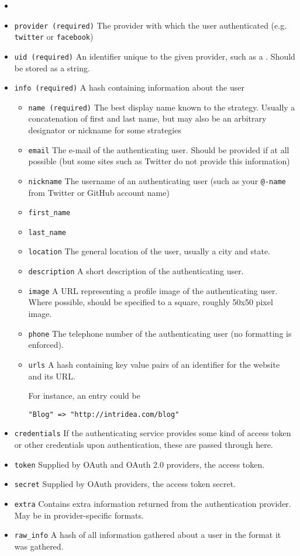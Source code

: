 \begin{itemize}
\item
\item \verb|provider (required)| The provider with which the user
authenticated (e.g. \verb'twitter' or \verb'facebook')

\item \verb|uid (required)| An identifier unique to the given provider,
such as a . Should be stored as a string.

\item \verb|info (required)| A hash containing information about the user
  \begin{itemize}
    \item \verb|name (required)| The best display name known to the
strategy. Usually a concatenation of first and last name, but may also
be an arbitrary designator or nickname for some strategies
    \item \verb|email| The e-mail of the authenticating user. Should be provided if at all possible (but some sites such as Twitter do not provide this information)
    \item \verb|nickname| The username of an authenticating user (such
    as your \verb|@-name| from Twitter or GitHub account name)
    \item \verb|first_name|
    \item \verb|last_name|
    \item \verb|location| The general location of the user, usually a city and state.
    \item \verb|description| A short description of the authenticating user.
    \item \verb|image| A URL representing a profile image of the
    authenticating user. Where possible, should be specified to a square,
    roughly 50x50 pixel image.
    \item \verb|phone| The telephone number of the authenticating user (no formatting is enforced).
    \item \verb|urls| A hash containing key value pairs of an identifier
    for the website and its URL. 

    For instance, an entry could be 
\begin{verbatim}
"Blog" => "http://intridea.com/blog"
\end{verbatim}
  \end{itemize}
\item \verb|credentials| If the authenticating service provides some
kind of access token or other credentials upon authentication, these
are passed through here.
\item \verb|token| Supplied by OAuth and OAuth 2.0 providers, the access token.
\item \verb|secret| Supplied by OAuth providers, the access token secret.
\item \verb|extra| Contains extra information returned from the
authentication provider. May be in provider-specific formats.
\item \verb|raw_info| A hash of all information gathered about a user
in the format it was gathered. 


\end{itemize}
